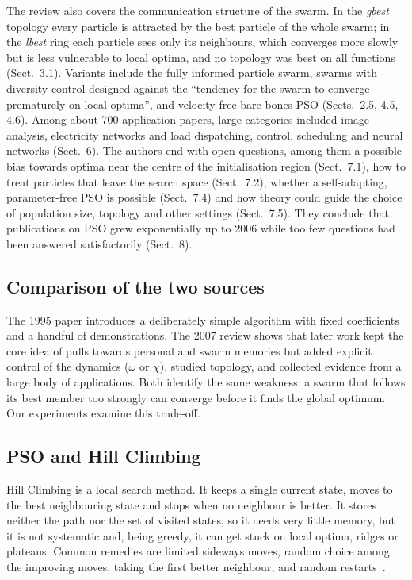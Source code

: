 \documentclass[11pt,a4paper]{article}
\newcommand{\tn}[1]{\textit{#1}}
\begin{document}
The review also covers the communication structure of the swarm. In the \tn{gbest} topology every particle is attracted by the best particle of the whole swarm; in the \tn{lbest} ring each particle sees only its neighbours, which converges more slowly but is less vulnerable to local optima, and no topology was best on all functions (Sect.~3.1). Variants include the fully informed particle swarm, swarms with diversity control designed against the ``tendency for the swarm to converge prematurely on local optima'', and velocity-free bare-bones PSO (Sects.~2.5, 4.5, 4.6). Among about 700 application papers, large categories included image analysis, electricity networks and load dispatching, control, scheduling and neural networks (Sect.~6). The authors end with open questions, among them a possible bias towards optima near the centre of the initialisation region (Sect.~7.1), how to treat particles that leave the search space (Sect.~7.2), whether a self-adapting, parameter-free PSO is possible (Sect.~7.4) and how theory could guide the choice of population size, topology and other settings (Sect.~7.5). They conclude that publications on PSO grew exponentially up to 2006 while too few questions had been answered satisfactorily (Sect.~8).

\subsection{Comparison of the two sources}
The 1995 paper introduces a deliberately simple algorithm with fixed coefficients and a handful of demonstrations. The 2007 review shows that later work kept the core idea of pulls towards personal and swarm memories but added explicit control of the dynamics ($\omega$ or $\chi$), studied topology, and collected evidence from a large body of applications. Both identify the same weakness: a swarm that follows its best member too strongly can converge before it finds the global optimum. Our experiments examine this trade-off.

\subsection{PSO and Hill Climbing}
Hill Climbing is a local search method. It keeps a single current state, moves to the best neighbouring state and stops when no neighbour is better. It stores neither the path nor the set of visited states, so it needs very little memory, but it is not systematic and, being greedy, it can get stuck on local optima, ridges or plateaus. Common remedies are limited sideways moves, random choice among the improving moves, taking the first better neighbour, and random restarts~\cite[slides 4--12]{nguyen2025}.
\end{document}
